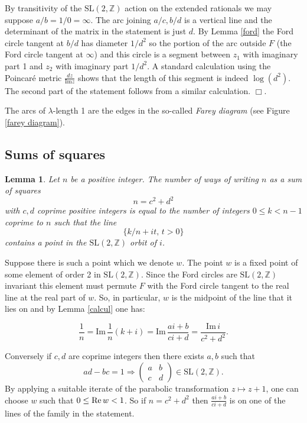 \documentclass[12pt,a4paper]{amsart}
\newtheorem{lem}[thm]{Lemma}
\def\im{\mathrm{Im}\,}
\def\ZZ{\mathbb{Z}}
\def\sl2{\mathrm{SL}(2, \ZZ)}
\begin{document}
\proof
By transitivity of the $\sl2$ action on the extended rationals
we may suppose $a/b = 1/0 = \infty$.
The arc joining $a/c, b/d$ is a vertical line and 
the determinant of the matrix in the statement  is just $d$.
By Lemma \ref{ford} the Ford circle tangent at $b/d$ 
has diameter $1/d^2$ so the portion of the arc 
outside $F$ (the Ford circle tangent at $\infty$) 
and this circle is a segment between $z_1$ with imaginary part 1
and $z_2$ with imaginary part $1/d^2$.
A standard calculation using the Poincaré metric $\frac{dz}{\mathrm{Im} z}$
shows that the length of this segment is indeed $\log (d^2)$. 
The second part of the statement follows from a similar calculation.
\hfill $\Box$.

The arcs of $\lambda$-length 1 are the edges in the so-called 
\textit{Farey diagram} (see Figure \ref{farey diagram}).

\subsection{Sums of squares}

\begin{lem} \label{squares}
Let $n$ be a positive integer.
The number of  ways of writing $n$  as a  sum of squares
$$n = c^2 + d^2$$
with $c,d$ coprime positive  integers
is equal to the number of  integers $0 \leq k < n-1$ coprime to $n$
such that the line
$$\{  k/n + i t,\, t >0 \}$$
contains  a point in the $\sl2$  orbit of $i$.
\end{lem}


\proof  Suppose there is such  a point which we denote  $w$.
The point $w$ is a fixed point of some  element of order 2 in $\sl2$.
Since the Ford circles are $\sl2$ invariant
this element must permute $F$ with the Ford circle tangent 
to the real line  at the real part of $w$.
So, in particular, $w$ is the midpoint of the line 
that it lies on 
and by  Lemma \ref{calcul} one has:

$$\frac{1}{n} = \im \frac{1 }{n}(k + i)  
= \im  \frac{ai +b}{ci+d }
= \frac{\im i} {c^2 + d^2}.$$

Conversely if $c,d$ are coprime integers 
 then there exists $a,b$ such that
 $$ad - bc = 1 \Rightarrow  
 \begin{pmatrix}
 a & b \\
 c & d
 \end{pmatrix} \in \sl2.
$$
By applying a suitable iterate of the parabolic transformation 
$z \mapsto z + 1$,
one can choose $w$ such that $0 \leq \text{Re\,} w < 1$.
So if $n = c^2 + d^2$ then $\frac{ai +b}{ci+d }$
is on one of the lines of the family in the statement.
\end{document}
